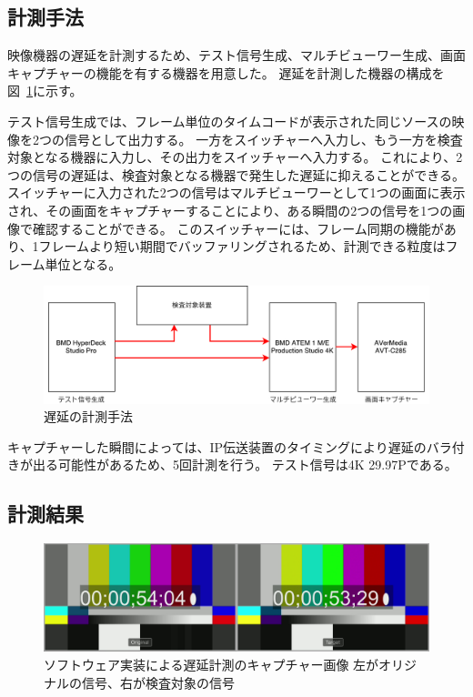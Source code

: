 \subsection{計測手法}

映像機器の遅延を計測するため、テスト信号生成、マルチビューワー生成、画面キャプチャーの機能を有する機器を用意した。
遅延を計測した機器の構成を図~\ref{fig:evaluate-diagram}に示す。

テスト信号生成では、フレーム単位のタイムコードが表示された同じソースの映像を2つの信号として出力する。
一方をスイッチャーへ入力し、もう一方を検査対象となる機器に入力し、その出力をスイッチャーへ入力する。
これにより、2つの信号の遅延は、検査対象となる機器で発生した遅延に抑えることができる。
スイッチャーに入力された2つの信号はマルチビューワーとして1つの画面に表示され、その画面をキャプチャーすることにより、ある瞬間の2つの信号を1つの画像で確認することができる。
このスイッチャーには、フレーム同期の機能があり、1フレームより短い期間でバッファリングされるため、計測できる粒度はフレーム単位となる。

\begin{figure}[htbp]
  \begin{center}
    \includegraphics[bb=0 0 697 212,width=15cm]{img/evaluate-diagram.pdf}
  \end{center}
  \caption{遅延の計測手法}
  \label{fig:evaluate-diagram}
\end{figure}

キャプチャーした瞬間によっては、IP伝送装置のタイミングにより遅延のバラ付きが出る可能性があるため、5回計測を行う。
テスト信号は4K 29.97Pである。

\subsection{計測結果}

\begin{figure}[htbp]
  \begin{center}
    \includegraphics[bb=0 0 1920 540,width=14cm]{img/evaluate-delay-software-1.png}
  \end{center}
  \caption[ソフトウェア実装による遅延計測のキャプチャー画像]{ソフトウェア実装による遅延計測のキャプチャー画像 左がオリジナルの信号、右が検査対象の信号}
  \label{fig:evaluate-delay-software-1}
\end{figure}

